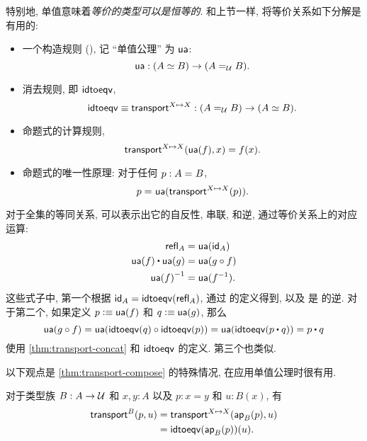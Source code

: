 特别地, 单值意味着\emph{等价的类型可以是恒等的}.
和上节一样, 将等价关系如下分解是有用的:
%
\begin{itemize}
    \item 一个构造规则 {()}, 记 ``单值公理'' 为 $\ua$:
    \[
        \ua : ({\eqv A B}) \to (\id[\type]{A}{B}).
    \]
    \item 消去规则, 即 $\idtoeqv$,
    \[
        \idtoeqv \jdeq \transfibf{X \mapsto X} : (\id[\type]{A}{B}) \to (\eqv A B).
    \]
    \item 命题式的计算规则,
    \[
        \transfib{X \mapsto X}{\ua(f)}{x} = f(x).
    \]
    \item 命题式的唯一性原理: 
    对于任何 $p : \id A B$,
    \[
        \id{p}{\ua(\transfibf{X \mapsto X}(p))}.
    \]
\end{itemize}
%
对于全集的等同关系, 可以表示出它的自反性, 串联, 和逆, 通过等价关系上的对应运算:
\begin{align*}
    \refl{A} &= \ua(\idfunc[A]) \\
    \ua(f) \ct \ua(g) &= \ua(g\circ f) \\
    \opp{\ua(f)} &= \ua(f^{-1}).
\end{align*}
这些式子中, 第一个根据 $\idfunc[A] = \idtoeqv(\refl{A})$, 通过 \idtoeqv 的定义得到, 以及 \ua 是 \idtoeqv 的逆.
对于第二个, 如果定义 $p \defeq \ua(f)$ 和 $q\defeq \ua(g)$, 那么
\[ \ua(g\circ f) = \ua(\idtoeqv(q) \circ \idtoeqv(p)) = \ua(\idtoeqv(p\ct q)) = p\ct q\]
使用 \cref{thm:transport-concat} 和 $\idtoeqv$ 的定义.
第三个也类似.

以下观点是 \cref{thm:transport-compose} 的特殊情况, 在应用单值公理时很有用.

\begin{lem}
    \label{thm:transport-is-ap}
    对于类型族 $B:A\to\type$ 和 $x,y:A$ 以及 $p:x=y$ 和 $u:B(x)$, 有
    \begin{align*}
        \transfib{B}{p}{u} &= \transfib{X\mapsto X}{\apfunc{B}(p)}{u}\\
        &= \idtoeqv(\apfunc{B}(p))(u).
    \end{align*}
\end{lem}

%
%